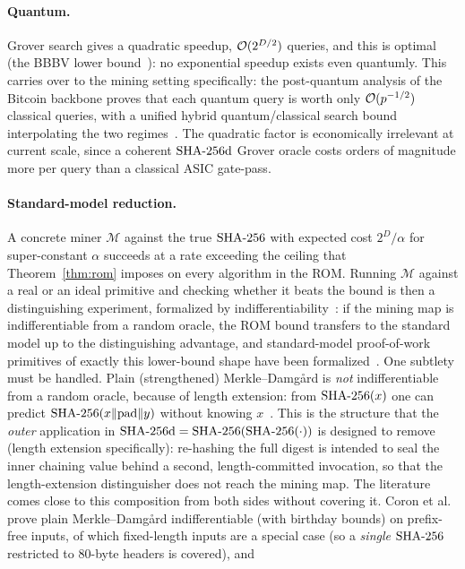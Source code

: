 \documentclass[11pt]{article}
\begin{document}
\paragraph{Quantum.}
Grover search gives a quadratic speedup, $\mathcal{O}(2^{D/2})$ queries, and
this is optimal (the BBBV lower bound~\cite{bbbv}): no exponential
speedup exists even quantumly. This carries over to the mining setting
specifically: the post-quantum analysis of the Bitcoin backbone proves
that each quantum query is worth only $\mathcal{O}(p^{-1/2})$ classical queries,
with a unified hybrid quantum/classical search bound interpolating the two
regimes~\cite{pqbackbone,hybrid}. The quadratic factor is economically
irrelevant at current scale, since a coherent $\mathrm{SHA\text{-}256d}$ Grover oracle costs
orders of magnitude more per query than a classical ASIC gate-pass.

\paragraph{Standard-model reduction.}
A concrete miner $\mathcal{M}$ against the true $\mathrm{SHA\text{-}256}$ with expected cost
$2^{D}/\alpha$ for super-constant $\alpha$ succeeds at a rate exceeding the
ceiling that Theorem~\ref{thm:rom} imposes on every algorithm in the ROM.
Running $\mathcal{M}$ against a real or an ideal primitive and checking
whether it beats the bound is then a distinguishing experiment, formalized
by indifferentiability~\cite{mrh}: if the mining map is indifferentiable
from a random oracle, the ROM bound transfers to the standard model up to
the distinguishing advantage, and standard-model proof-of-work primitives
of exactly this lower-bound shape have been formalized~\cite{gkp}. One
subtlety must be handled. Plain (strengthened) Merkle--Damg\aa rd is
\emph{not} indifferentiable from a random oracle, because of length
extension: from $\mathrm{SHA\text{-}256}(x)$ one can predict $\mathrm{SHA\text{-}256}(x\Vert\mathrm{pad}\Vert
y)$ without knowing $x$~\cite{coron}. This is the structure that the
\emph{outer} application in $\mathrm{SHA\text{-}256d}=\mathrm{SHA\text{-}256}(\mathrm{SHA\text{-}256}(\cdot))$ is designed to remove
(length extension specifically): re-hashing the full digest is intended to
seal the inner chaining value behind a second, length-committed
invocation, so that the length-extension distinguisher does not reach the
mining map. The literature comes close to this composition from both
sides without covering it. Coron et al.~\cite{coron} prove plain
Merkle--Damg\aa rd indifferentiable (with birthday bounds) on prefix-free
inputs, of which fixed-length inputs are a special case (so a
\emph{single} $\mathrm{SHA\text{-}256}$ restricted to 80-byte headers is covered), and
\end{document}
